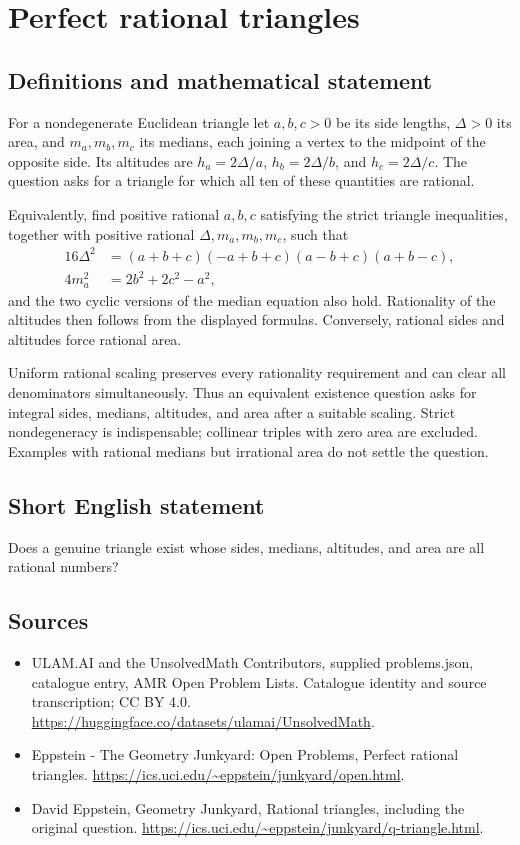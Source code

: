 \documentclass[11pt,a4paper]{article}
\begin{document}
\section*{Perfect rational triangles}\label{statement}

\subsection{Definitions and mathematical statement}
For a nondegenerate Euclidean triangle let $a,b,c>0$ be its side lengths,
$\Delta>0$ its area, and $m_a,m_b,m_c$ its medians, each joining a vertex
to the midpoint of the opposite side. Its altitudes are
$h_a=2\Delta/a$, $h_b=2\Delta/b$, and $h_c=2\Delta/c$.
The question asks for a triangle for which all ten of these quantities
are rational.

Equivalently, find positive rational $a,b,c$ satisfying the strict triangle
inequalities, together with positive rational $\Delta,m_a,m_b,m_c$, such that
\[
 \begin{aligned}
 16\Delta^2&=(a+b+c)(-a+b+c)(a-b+c)(a+b-c),\\
 4m_a^2&=2b^2+2c^2-a^2,
 \end{aligned}
\]
and the two cyclic versions of the median equation also hold. Rationality
of the altitudes then follows from the displayed formulas. Conversely,
rational sides and altitudes force rational area.

Uniform rational scaling preserves every rationality requirement and can
clear all denominators simultaneously. Thus an equivalent existence
question asks for integral sides, medians, altitudes, and area after a
suitable scaling. Strict nondegeneracy is indispensable; collinear triples
with zero area are excluded. Examples with rational medians but irrational
area do not settle the question.
\subsection{Short English statement}
Does a genuine triangle exist whose sides, medians, altitudes, and area
are all rational numbers?
\subsection{Sources}
\begin{itemize}
\item[S1] ULAM.AI and the UnsolvedMath Contributors, supplied problems.json, catalogue entry, AMR Open Problem Lists. Catalogue identity and source transcription; CC BY 4.0.
\url{https://huggingface.co/datasets/ulamai/UnsolvedMath}.
\item[S2] Eppstein - The Geometry Junkyard: Open Problems, Perfect rational triangles. 
\url{https://ics.uci.edu/~eppstein/junkyard/open.html}.
\item[S3] David Eppstein, Geometry Junkyard, Rational triangles, including the original question.
\url{https://ics.uci.edu/~eppstein/junkyard/q-triangle.html}.
\end{itemize}
\end{document}
